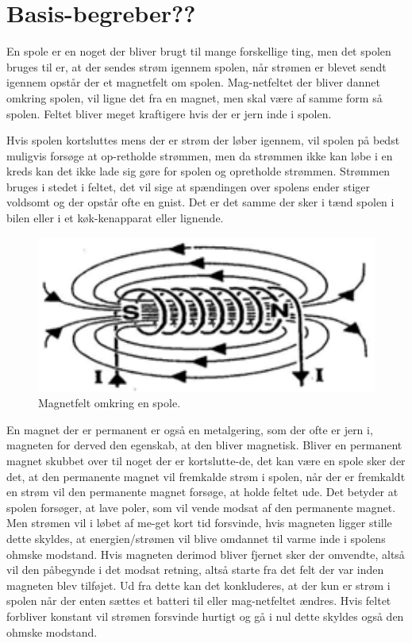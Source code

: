 \section{Basis-begreber??}

En spole er en noget der bliver brugt til mange forskellige ting, men det spolen bruges til er, at der sendes strøm igennem spolen, når strømen er blevet sendt igennem opstår der et magnetfelt om spolen. Mag-netfeltet der bliver dannet omkring spolen, vil ligne det fra en magnet, men skal være af samme form så spolen. Feltet bliver meget kraftigere hvis der er jern inde i spolen. 

Hvis spolen kortsluttes mens der er strøm der løber igennem, vil spolen på bedst muligvis forsøge at op-retholde strømmen, men da strømmen ikke kan løbe i en kreds kan det ikke lade sig gøre for spolen og opretholde strømmen.  Strømmen bruges i stedet i feltet, det vil sige at spændingen over spolens ender stiger voldsomt og der opstår ofte en gnist. Det er det samme der sker i tænd spolen i bilen eller i et køk-kenapparat eller lignende.

\begin{figure}[htbp]
	\centering
	\includegraphics[width=1\textwidth]{Vildledning/Schematics/magnetfelt_omkring_en_spole.png}
	\caption{Magnetfelt omkring en spole.\cite{spoler}}
	\label{spole1}
\end{figure}

En magnet der er permanent er også en metalgering, som der ofte er jern i, magneten for derved den egenskab, at den bliver magnetisk.  Bliver en permanent magnet skubbet over til noget der er kortslutte-de, det kan være en spole sker der det, at den permanente magnet vil fremkalde strøm i spolen, når der er fremkaldt en strøm vil den permanente magnet forsøge, at holde feltet ude. Det betyder at spolen forsøger, at lave poler, som vil vende modsat af den permanente magnet. Men strømen vil i løbet af me-get kort tid forsvinde, hvis magneten ligger stille dette skyldes, at energien/strømen vil blive omdannet til varme inde i spolens ohmske modstand. Hvis magneten derimod bliver fjernet sker der omvendte, altså vil den påbegynde i det modsat retning, altså starte fra det felt der var inden magneten blev tilføjet. Ud fra dette kan det konkluderes, at der kun er strøm i spolen når der enten sættes et batteri til eller mag-netfeltet ændres. Hvis feltet forbliver konstant vil strømen forsvinde hurtigt og gå i nul dette skyldes også den ohmske modstand. 

